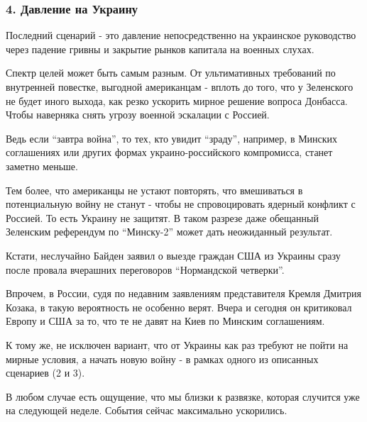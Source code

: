  
 
 
 
 

\subsubsection{4. Давление на Украину}

Последний сценарий - это давление непосредственно на украинское руководство
через падение гривны и закрытие рынков капитала на военных слухах. 

Спектр целей может быть самым разным. От ультимативных требований по внутренней
повестке, выгодной американцам - вплоть до того, что у Зеленского не будет
иного выхода, как резко ускорить мирное решение вопроса Донбасса. Чтобы
наверняка снять угрозу военной эскалации с Россией. 

Ведь если \enquote{завтра война}, то тех, кто увидит \enquote{зраду}, например, в Минских
соглашениях или других формах украино-российского компромисса, станет заметно
меньше.

Тем более, что американцы не устают повторять, что вмешиваться в потенциальную
войну не станут - чтобы не спровоцировать ядерный конфликт с Россией. То есть
Украину не защитят. В таком разрезе даже обещанный Зеленским референдум по
\enquote{Минску-2} может дать неожиданный результат. 

Кстати, неслучайно Байден заявил о выезде граждан США из Украины сразу после
провала вчерашних переговоров \enquote{Нормандской четверки}. 

Впрочем, в России, судя по недавним заявлениям представителя Кремля Дмитрия
Козака, в такую вероятность не особенно верят. Вчера и сегодня он критиковал
Европу и США за то, что те не давят на Киев по Минским соглашениям. 

К тому же, не исключен вариант, что от Украины как раз требуют не пойти на
мирные условия, а начать новую войну - в рамках одного из описанных сценариев
(2 и 3). 

В любом случае есть ощущение, что мы близки к развязке, которая случится уже на
следующей неделе. События сейчас максимально ускорились.


